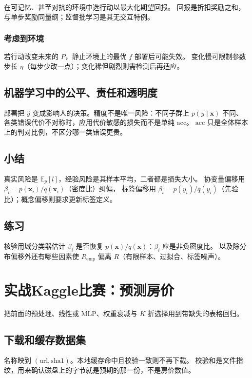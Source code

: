 在可记忆、甚至对抗的环境中选行动以最大化期望回报。
回报是折扣奖励之和，与单步奖励同量纲；监督批学习是其无交互特例。

\subsubsection{考虑到环境}

若行动改变未来的 $P$，静止环境上的最优 $f$ 部署后可能失效。
变化慢可限制参数步长 $\eta$（每步少改一点）；变化稀但剧烈则需检测后再适应。

\subsection{机器学习中的公平、责任和透明度}

部署把 $\hat{y}$ 变成影响人的决策。精度不是唯一风险：不同子群上 $p(y\mid\bm{x})$ 不同、
各类错误代价不对称时，应用代价敏感的损失而不是单纯 $\mathrm{acc}$。
$\mathrm{acc}$ 只是全体样本上的判对比例，不区分哪一类错误更贵。

\subsection{小结}

真实风险是 $\mathbb{E}_{p}[l]$，经验风险是其样本平均，二者都是损失大小。
协变量偏移用 $\beta_{i}=p(\bm{x}_{i})/q(\bm{x}_{i})$（密度比）纠偏，
标签偏移用 $\beta_{i}=p(y_{i})/q(y_{i})$（先验比）；概念偏移则要求更新标签定义。

\subsection{练习}

核验用域分类器估计 $\beta_{i}$ 是否恢复 $p(\bm{x})/q(\bm{x})$：$\beta_i$ 应是非负密度比。
以及除分布偏移外还有哪些因素使 $R_{\mathrm{emp}}$ 偏离 $R$（有限样本、过拟合、标签噪声）。

\section{实战Kaggle比赛：预测房价}

把前面的预处理、线性或 MLP、权重衰减与 $K$ 折选择用到带缺失的表格回归。

\subsection{下载和缓存数据集}

名称映到 $(\mathrm{url},\mathrm{sha1})$。本地缓存命中且校验一致则不再下载。
校验和是文件指纹，用来确认磁盘上的字节就是预期的那一份，不是房价数值。

